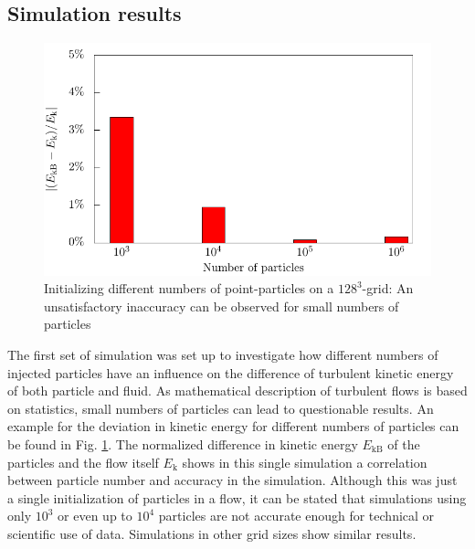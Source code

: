 \documentclass[11pt,a4paper,openany,oneside,parskip=half*]{article}
\begin{document}
\subsection{Simulation results}
\begin{figure}[h]
    \centering
    \begin{minipage}{0.5\textwidth}
        \centering
 	   \includegraphics[width=\linewidth]{./Abbildungen/kineticEnergy_numberOfParticles.pdf}
    \end{minipage}%
        \begin{minipage}{0.5\textwidth}
        \centering
        \caption{Initializing different numbers of point-particles on a $128^3$-grid: An unsatisfactory inaccuracy can be observed for small numbers of particles}
	\label{kineticEnergy_numberofparticles}
    \end{minipage}
    \end{figure}
The first set of simulation was set up to investigate how different numbers of injected particles have an influence on the difference of turbulent kinetic energy of both particle and fluid. As mathematical description of turbulent flows is based on statistics, small numbers of particles can lead to questionable results. An example for the deviation in kinetic energy for different numbers of particles can be found in Fig. \ref{kineticEnergy_numberofparticles}. The normalized difference in kinetic energy $E_\mathrm{kB}$ of the particles and the flow itself $E_\mathrm{k}$ shows in this single simulation a correlation between particle number and accuracy in the simulation. Although this was just a single initialization of particles in a flow, it can be stated that simulations using only $10^3$ or even up to $10^4$ particles are not accurate enough for technical or scientific use of data. Simulations in other grid sizes show similar results.
\end{document}

